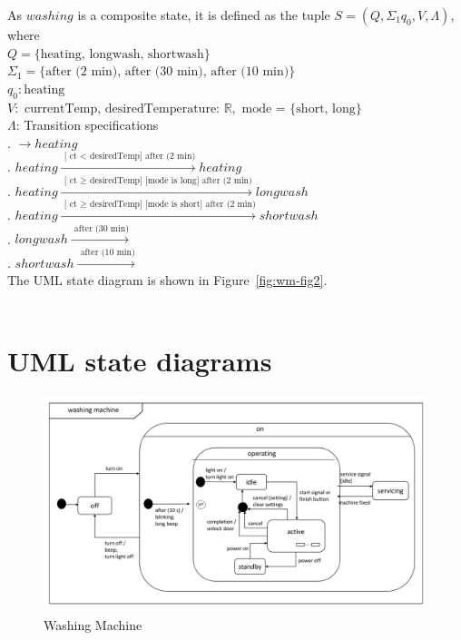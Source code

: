 \documentclass[12pt]{article}
\begin{document}
\begin{spacing}{1.5}
\noindent As $washing$ is a composite state, it is defined as the tuple $S = (Q, \Sigma_1 q_0, V, \Lambda)$, where\\
\noindent $Q = \{\text {heating, longwash, shortwash}\}$\\
\noindent $\Sigma_1 = \{\text {after (2 min), after (30 min), after (10 min)}\}$\\ 
\noindent $q_0: \text{heating}$\\
\noindent $V: \text{ currentTemp, desiredTemperature: } \mathbb{R}, \text{ mode = \{short, long\}}$\\
\noindent $\Lambda$: Transition specifications\\
. $\xrightarrow {} heating$\\
. $heating \xrightarrow {\text { [ ct $<$ desiredTemp] after (2 min)}} heating $\\
. $heating \xrightarrow {\text { [ ct $\geq$ desiredTemp] [mode is long] after (2 min)}}  longwash$\\
. $heating \xrightarrow {\text { [ ct $\geq$ desiredTemp] [mode is short] after (2 min)}}  shortwash$\\
. $longwash  \xrightarrow {\text { after (30 min)}}$\\
. $shortwash  \xrightarrow {\text { after (10 min)}}$\\

\noindent The UML state diagram is shown in Figure~\ref{fig:wm-fig2}.\\\\
\newpage

\section{UML state diagrams}

\begin{figure}[h!]
	\centering
		\includegraphics[page=1,width=1\textwidth]{./figures/updatedSecondDraft.pdf}
		  \caption{Washing Machine}
  \label{fig:wm-fig1}
\end{figure}


\end{spacing}
\end{document}
